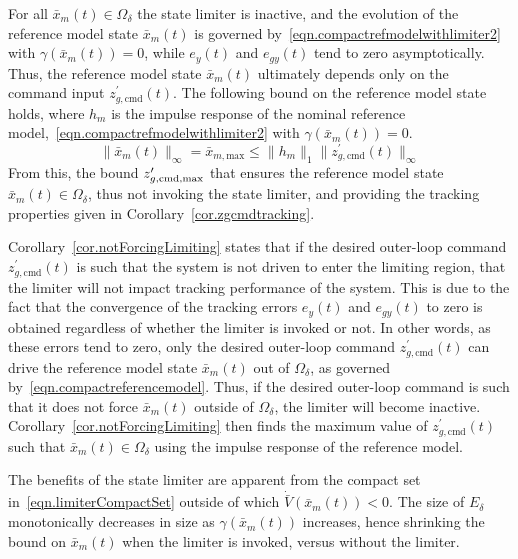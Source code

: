 \documentclass[journal]{IEEEtran}
\theoremstyle{innercustomthm}
\begin{document}
  \begin{proof-dan}
    For all $\bar{x}_{m}(t)\in\Omega_{\delta}$ the state limiter is inactive, and the evolution of the reference model state $\bar{x}_{m}(t)$ is governed by\ \eqref{eqn.compactrefmodelwithlimiter2} with $\gamma(\bar{x}_{m}(t))=0$, while $e_{y}(t)$ and $e_{gy}(t)$ tend to zero asymptotically.
    Thus, the reference model state $\bar{x}_{m}(t)$ ultimately depends only on the command input $z_{g,\text{cmd}}^{\prime}(t)$.
    The following bound on the reference model state holds, where $h_{m}$ is the impulse response of the nominal reference model,\ \eqref{eqn.compactrefmodelwithlimiter2} with $\gamma(\bar{x}_{m}(t))=0$.
    \begin{equation*}
      \|\bar{x}_{m}(t)\|_{\infty}=\bar{x}_{m,\text{max}} \leq \|h_{m}\|_{1}\|z_{g,\text{cmd}}^{\prime}(t)\|_{\infty}
    \end{equation*}
    From this, the bound $z_{g,\text{\rm{cmd,max}}}^{\prime}$ that ensures the reference model state $\bar{x}_{m}(t)\in\Omega_{\delta}$, thus not invoking the state limiter, and providing the tracking properties given in Corollary~\ref{cor.zgcmdtracking}.
  \end{proof-dan}

  \begin{rem-dan}
    Corollary~\ref{cor.notForcingLimiting} states that if the desired outer-loop command $z_{g,\text{cmd}}^{\prime}(t)$ is such that the system is not driven to enter the limiting region, that the limiter will not impact tracking performance of the system.
    This is due to the fact that the convergence of the tracking errors $e_{y}(t)$ and $e_{gy}(t)$ to zero is obtained regardless of whether the limiter is invoked or not.
    In other words, as these errors tend to zero, only the desired outer-loop command $z_{g,\text{cmd}}^{\prime}(t)$ can drive the reference model state $\bar{x}_{m}(t)$ out of $\Omega_{\delta}$, as governed by\ \eqref{eqn.compactreferencemodel}.
    Thus, if the desired outer-loop command is such that it does not force $\bar{x}_{m}(t)$ outside of $\Omega_{\delta}$, the limiter will become inactive.
    Corollary~\ref{cor.notForcingLimiting} then finds the maximum value of $z_{g,\text{cmd}}^{\prime}(t)$ such that $\bar{x}_{m}(t)\in\Omega_{\delta}$ using the impulse response of the reference model.
  \end{rem-dan}

  \begin{rem-dan}
    The benefits of the state limiter are apparent from the compact set in\ \eqref{eqn.limiterCompactSet} outside of which $\dot{\bar{V}}(\bar{x}_{m}(t))<0$.
    The size of $E_{\delta}$ monotonically decreases in size as $\gamma(\bar{x}_{m}(t))$ increases, hence shrinking the bound on $\bar{x}_{m}(t)$ when the limiter is invoked, versus without the limiter.
  \end{rem-dan}
\end{document}
